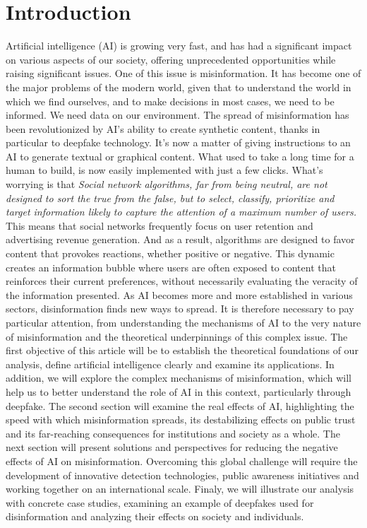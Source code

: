 \section{Introduction}
Artificial intelligence (AI) is growing very fast, and has had a significant impact on various aspects of our society, offering unprecedented opportunities while raising significant issues. One of this issue is misinformation. It has become one of the major problems of the modern world, given that to understand the world in which we find ourselves, and to make decisions in most cases, we need to be informed. We need data on our environment. The spread of misinformation has been revolutionized by AI's ability to create synthetic content, thanks in particular to deepfake technology. It's now a matter of giving instructions to an AI to generate textual or graphical content. What used to take a long time for a human to build, is now easily implemented with just a few clicks.
 What's worrying is that \emph{Social network algorithms, far from being neutral, are not designed to sort the true from the false, but to select, classify, prioritize and target information likely to capture the attention of a maximum number of users\cite{InternetAutorouteDesinformation}.} This means that social networks frequently focus on user retention and advertising revenue generation. And as a result, algorithms are designed to favor content that provokes reactions, whether positive or negative. This dynamic creates an information bubble where users are often exposed to content that reinforces their current preferences, without necessarily evaluating the veracity of the information presented. As AI becomes more and more established in various sectors, disinformation finds new ways to spread. It is therefore necessary to pay particular attention, from understanding the mechanisms of AI to the very nature of misinformation and the theoretical underpinnings of this complex issue. The first objective of this article will be to establish the theoretical foundations of our analysis, define artificial intelligence clearly and examine its applications. In addition, we will explore the complex mechanisms of misinformation, which will help us to better understand the role of AI in this context, particularly through deepfake.
The second section will examine the real effects of AI, highlighting the speed with which misinformation spreads, its destabilizing effects on public trust and its far-reaching consequences for institutions and society as a whole.
The next section will present solutions and perspectives for reducing the negative effects of AI on misinformation. Overcoming this global challenge will require the development of innovative detection technologies, public awareness initiatives and working together on an international scale.
Finaly, we will illustrate our analysis with concrete case studies, examining an example of deepfakes used for disinformation and analyzing their effects on society and individuals.
